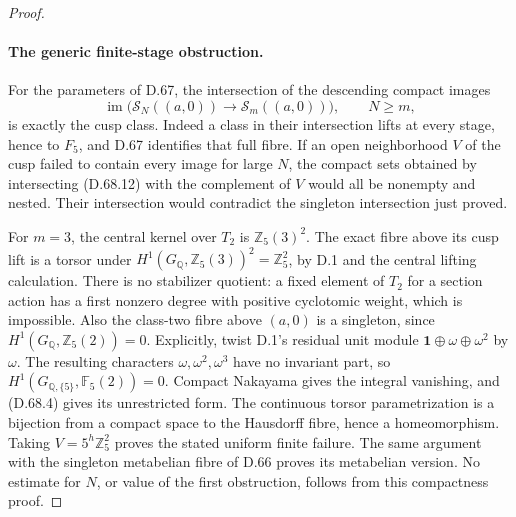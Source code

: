 \begin{proof}
\paragraph{The generic finite-stage obstruction.}
For the parameters of D.67, the intersection
of the descending compact images
\[
 \operatorname{im}\bigl(\mathscr S_N((a,0))
                      \longrightarrow\mathscr S_m((a,0))\bigr),
                         \qquad N\ge m,
                                                        \tag{D.68.12}
\]
is exactly the cusp class. Indeed a class
in their intersection lifts at every stage,
hence to \(F_5\), and D.67 identifies that
full fibre. If an open neighborhood \(V\)
of the cusp failed to contain every image
for large \(N\), the compact sets obtained
by intersecting (D.68.12) with the complement
of \(V\) would all be nonempty and nested.
Their intersection would contradict the
singleton intersection just proved.

For \(m=3\), the central kernel over \(T_2\)
is \(\mathbb Z_5(3)^2\). The exact fibre
above its cusp lift is a torsor under
\(H^1(G_{\mathbb Q},\mathbb Z_5(3))^2
=\mathbb Z_5^2\), by D.1 and the central
lifting calculation. There is no stabilizer
quotient: a fixed element of \(T_2\) for a
section action has a first nonzero degree
with positive cyclotomic weight, which is
impossible. Also the class-two fibre above
\((a,0)\) is a singleton, since
\(H^1(G_{\mathbb Q},\mathbb Z_5(2))=0\).
Explicitly, twist D.1's residual unit module
\(\mathbf1\oplus\omega\oplus\omega^2\) by
\(\omega\). The resulting characters
\(\omega,\omega^2,\omega^3\) have no invariant
part, so \(H^1(G_{\mathbb Q,\{5\}},\mathbb F_5(2))=0\).
Compact Nakayama gives the integral vanishing,
and (D.68.4) gives its unrestricted form.
The continuous torsor parametrization is a
bijection from a compact space to the
Hausdorff fibre, hence a homeomorphism.
Taking \(V=5^h\mathbb Z_5^2\) proves the
stated uniform finite failure. The same
argument with the singleton metabelian
fibre of D.66 proves its metabelian version.
No estimate for \(N\), or value of the
first obstruction, follows from this
compactness proof.
\end{proof}

